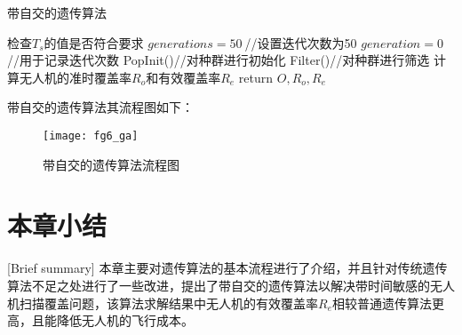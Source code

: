 \begin{algorithm}[H]  %
	\caption{带自交的遗传算法}%
	\LinesNumbered %
	检查$T_s$的值是否符合要求\; %
	$generations = 50~$//设置迭代次数为50\;
	$generation = 0~$//用于记录迭代次数\;
	PopInit()//对种群进行初始化\;
	Filter()//对种群进行筛选\;
	计算无人机的准时覆盖率$R_o$和有效覆盖率$R_e$\;
	return $O,R_o,R_e$
	
\end{algorithm}


带自交的遗传算法其流程图如下：
\begin{figure}[H]
	\centering
	\texttt{[image: fg6\_ga]}
	\caption{带自交的遗传算法流程图}
	\label{fg403}
\end{figure}

\section{本章小结}[Brief summary]
本章主要对遗传算法的基本流程进行了介绍，并且针对传统遗传算法不足之处进行了一些改进，提出了带自交的遗传算法以解决带时间敏感的无人机扫描覆盖问题，该算法求解结果中无人机的有效覆盖率$R_e$相较普通遗传算法更高，且能降低无人机的飞行成本。